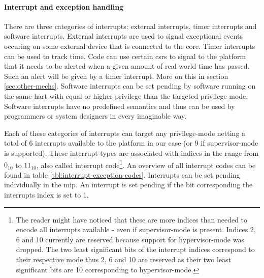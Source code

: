 \paragraph{Interrupt and exception handling}
There are three categories of interrupts: external interrupts, timer interrupts and software interrupts.
External interrupts are used to signal exceptional events occuring on some external device that is connected to the core.
Timer interrupts can be used to track time.
Code can use certain \glspl{csr} to signal to the platform that it needs to be alerted when a given amount of real world time has passed.
Such an alert will be given by a timer interrupt.
More on this in section \ref{sec:other-mechs}.
Software interrupts can be set pending by software running on the same \gls{hart} with equal or higher privilege than the targeted privilege mode.
Software interrupts have no predefined semantics and thus can be used by programmers or system designers in every imaginable way.

Each of these categories of interrupts can target any privilege-mode netting a total of 6 interrupts available to the platform in our case (or 9 if supervisor-mode is supported).
These interrupt-types are associated with indices in the range from $ 0_{10} $ to $ 11_{10} $, also called interrupt code\footnote{%
    The reader might have noticed that these are more indices than needed to encode all interrupts available - even if supervisor-mode is present.
    Indices 2, 6 and 10 currently are reserved because support for hypervisor-mode was dropped.
    The two least significant bits of the interrupt indices correspond to their respective mode thus 2, 6 and 10 are reserved as their two least significant bits are 10 corresponding to hypervisor-mode.
}.
An overview of all interrupt codes can be found in table \ref{tbl:interrupt-exception-codes}.
Interrupts can be set pending individually in the \gls{mip}.
An interrupt is set pending if the bit corresponding the interrupts index is set to 1.

